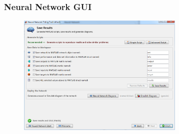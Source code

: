 \documentclass[slidestop,compress,mathserif,c]{beamer}
\begin{document}
\begin{frame}
\frametitle{Neural Network GUI}

\begin{figure}
\centering
\includegraphics[width=8cm]{12}
\end{figure}
\end{frame}




\end{document}
